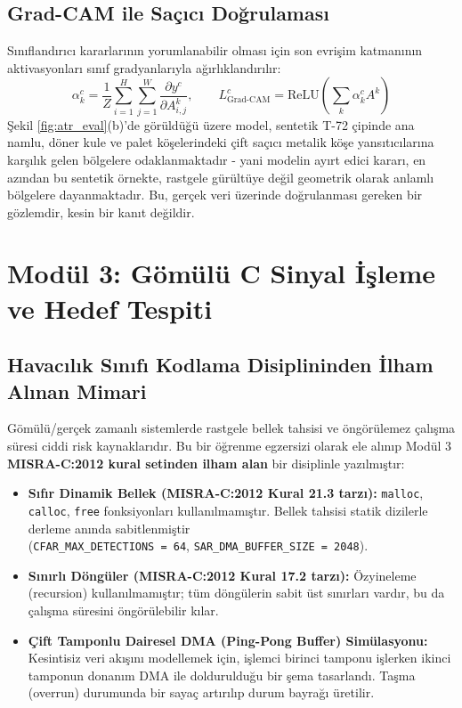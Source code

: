 \documentclass[11pt,a4paper]{article}
\begin{document}
\subsection{Grad-CAM ile Saçıcı Doğrulaması}
Sınıflandırıcı kararlarının yorumlanabilir olması için son evrişim katmanının aktivasyonları sınıf gradyanlarıyla ağırlıklandırılır:
\begin{equation}
\alpha_k^c = \frac{1}{Z} \sum_{i=1}^H \sum_{j=1}^W \frac{\partial y^c}{\partial A_{i,j}^k}, \qquad L_{\text{Grad-CAM}}^c = \text{ReLU}\left( \sum_k \alpha_k^c A^k \right)
\end{equation}
Şekil \ref{fig:atr_eval}(b)'de görüldüğü üzere model, sentetik T-72 çipinde ana namlu, döner kule ve palet köşelerindeki çift saçıcı metalik köşe yansıtıcılarına karşılık gelen bölgelere odaklanmaktadır - yani modelin ayırt edici kararı, en azından bu sentetik örnekte, rastgele gürültüye değil geometrik olarak anlamlı bölgelere dayanmaktadır. Bu, gerçek veri üzerinde doğrulanması gereken bir gözlemdir, kesin bir kanıt değildir.


\section{Modül 3: Gömülü C Sinyal İşleme ve Hedef Tespiti}

\subsection{Havacılık Sınıfı Kodlama Disiplininden İlham Alınan Mimari}
Gömülü/gerçek zamanlı sistemlerde rastgele bellek tahsisi ve öngörülemez çalışma süresi ciddi risk kaynaklarıdır. Bu bir öğrenme egzersizi olarak ele alınıp Modül 3 \textbf{MISRA-C:2012 kural setinden ilham alan} bir disiplinle yazılmıştır:
\begin{itemize}
    \item \textbf{Sıfır Dinamik Bellek (MISRA-C:2012 Kural 21.3 tarzı):} \texttt{malloc}, \texttt{calloc}, \texttt{free} fonksiyonları kullanılmamıştır. Bellek tahsisi statik dizilerle derleme anında sabitlenmiştir\\ (\texttt{CFAR\_MAX\_DETECTIONS = 64}, \texttt{SAR\_DMA\_BUFFER\_SIZE = 2048}).
    \item \textbf{Sınırlı Döngüler (MISRA-C:2012 Kural 17.2 tarzı):} Özyineleme (recursion) kullanılmamıştır; tüm döngülerin sabit üst sınırları vardır, bu da çalışma süresini öngörülebilir kılar.
    \item \textbf{Çift Tamponlu Dairesel DMA (Ping-Pong Buffer) Simülasyonu:} Kesintisiz veri akışını modellemek için, işlemci birinci tamponu işlerken ikinci tamponun donanım DMA ile doldurulduğu bir şema tasarlandı. Taşma (overrun) durumunda bir sayaç artırılıp durum bayrağı üretilir.
\end{itemize}
\end{document}
